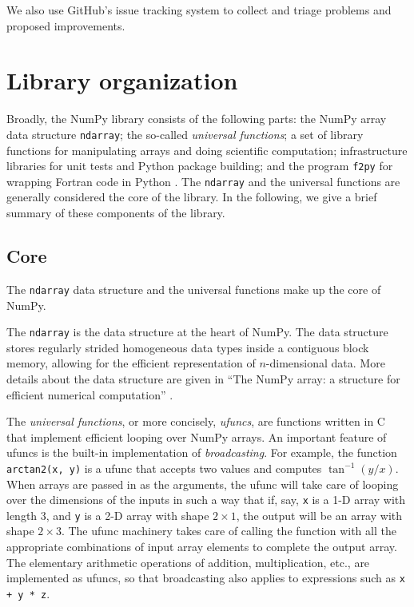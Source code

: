 We also use GitHub's issue tracking system to collect and triage problems and
proposed improvements.


\section*{Library organization}

Broadly, the NumPy library consists of the following parts:
the NumPy array data structure \texttt{ndarray}; the so-called \emph{universal functions};
a set of library functions for manipulating arrays and doing scientific
computation; infrastructure libraries for unit tests and Python package
building; and the program \texttt{f2py} for wrapping Fortran code in Python \cite{peterson2009f2py}.
The \texttt{ndarray} and the universal functions are generally considered
the core of the library.
In the following, we give a brief summary of these components of the
library.

\subsection*{Core}

The \texttt{ndarray} data structure and the
universal functions make up the core of NumPy.

The \texttt{ndarray} is the data structure at the heart of NumPy.
The data structure stores regularly strided homogeneous data types
inside a contiguous block memory, allowing for the efficient representation
of $n$-dimensional data.
More details about the data structure are given in ``The NumPy array:
a structure for efficient numerical computation'' \cite{vanderwalt2011numpy}.

The \emph{universal functions}, or more concisely, \emph{ufuncs},
are functions written in C that implement efficient looping over
NumPy arrays. An important feature of ufuncs is the built-in
implementation of \emph{broadcasting}.  For example, the function
\texttt{arctan2(x, y)} is a ufunc that accepts two values and computes
$\tan^{-1}(y/x)$.  When arrays are passed in as the arguments,
the ufunc will take care of looping over the dimensions of the inputs
in such a way that if, say, \texttt{x} is a 1-D array with length 3, and
\texttt{y} is a 2-D array with shape $2 \times 1$, the output will be
an array with shape $2 \times 3$.
The ufunc machinery takes care
of calling the function with all the appropriate combinations of
input array elements to complete the output array.
The elementary arithmetic operations of addition, multiplication, etc.,
are implemented as ufuncs, so that broadcasting also applies to expressions
such as \texttt{x + y * z}.

